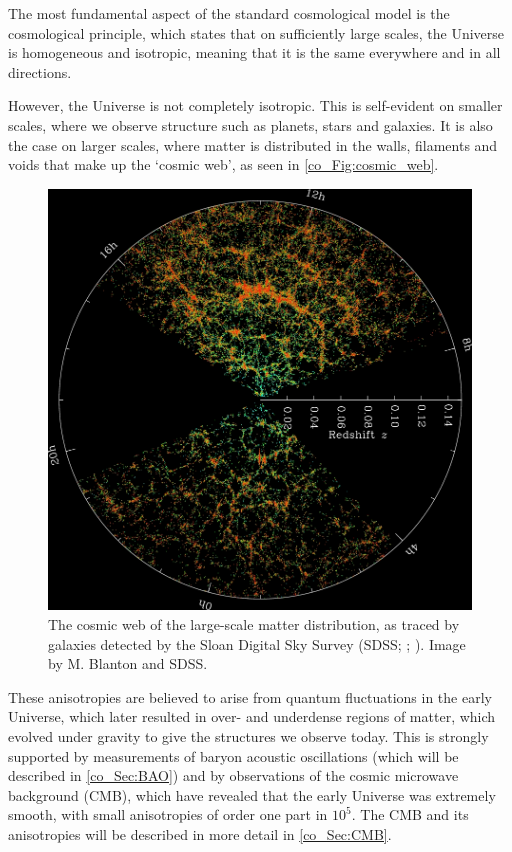 The most fundamental aspect of the standard cosmological model is the cosmological principle, which states that on sufficiently large scales, the Universe is homogeneous and isotropic, meaning that it is the same everywhere and in all directions.

However, the Universe is not completely isotropic. This is self-evident on smaller scales, where we observe structure such as planets, stars and galaxies. It is also the case on larger scales, where matter is distributed in the walls, filaments and voids that make up the `cosmic web', as seen in \autoref{co_Fig:cosmic_web}.

\begin{figure}
\centering
\includegraphics[width=\textwidth]{sdss}
\caption{The cosmic web of the large-scale matter distribution, as traced by galaxies detected by the Sloan Digital Sky Survey (SDSS; \cite{York2000}; \cite{Blanton2017}). Image by M. Blanton and SDSS.}
\label{co_Fig:cosmic_web}
\end{figure}

These anisotropies are believed to arise from quantum fluctuations in the early Universe, which later resulted in over- and underdense regions of matter, which evolved under gravity to give the structures we observe today. This is strongly supported by measurements of baryon acoustic oscillations (which will be described in \autoref{co_Sec:BAO}) and by observations of the cosmic microwave background (CMB), which have revealed that the early Universe was extremely smooth, with small anisotropies of order one part in $10^5$. The CMB and its anisotropies will be described in more detail in \autoref{co_Sec:CMB}.

